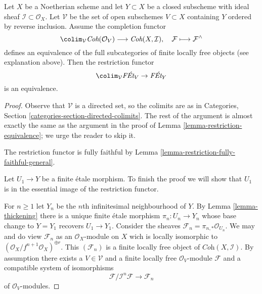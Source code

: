 \begin{lemma}
\label{lemma-restriction-equivalence-general}
Let $X$ be a Noetherian scheme and let $Y \subset X$ be a closed subscheme
with ideal sheaf $\mathcal{I} \subset \mathcal{O}_X$.
Let $\mathcal{V}$ be the set of open subschemes $V \subset X$ containing $Y$
ordered by reverse inclusion. Assume the completion functor
$$
\colim_\mathcal{V} \textit{Coh}(\mathcal{O}_V)
\longrightarrow
\textit{Coh}(X, \mathcal{I}),
\quad
\mathcal{F} \longmapsto \mathcal{F}^\wedge
$$
defines an equivalence of the full subcategories of
finite locally free objects (see explanation above).
Then the restriction functor
$$
\colim_\mathcal{V} \textit{F\'Et}_V \to \textit{F\'Et}_Y
$$
is an equivalence.
\end{lemma}

\begin{proof}
Observe that $\mathcal{V}$ is a directed set, so the colimits are
as in Categories, Section \ref{categories-section-directed-colimits}.
The rest of the argument is almost exactly the same as the argument
in the proof of Lemma \ref{lemma-restriction-equivalence}; we urge
the reader to skip it.

\medskip\noindent
The restriction functor is fully faithful by
Lemma \ref{lemma-restriction-fully-faithful-general}.

\medskip\noindent
Let $U_1 \to Y$ be a finite \'etale morphism. To finish the proof
we will show that $U_1$ is in the essential image of the
restriction functor.

\medskip\noindent
For $n \geq 1$ let $Y_n$ be the $n$th infinitesimal neighbourhood of $Y$.
By Lemma \ref{lemma-thickening}
there is a unique finite \'etale morphism
$\pi_n : U_n \to Y_n$ whose base change to $Y = Y_1$
recovers $U_1 \to Y_1$.
Consider the sheaves $\mathcal{F}_n = \pi_{n, *}\mathcal{O}_{U_n}$.
We may and do view $\mathcal{F}_n$ as an $\mathcal{O}_X$-module on $X$
wich is locally isomorphic to
$(\mathcal{O}_X/f^{n + 1}\mathcal{O}_X)^{\oplus r}$.
This $(\mathcal{F}_n)$ is a finite locally free object of
$\textit{Coh}(X, \mathcal{I})$.
By assumption there exists a $V \in \mathcal{V}$
and a finite locally free $\mathcal{O}_V$-module $\mathcal{F}$
and a compatible system of isomorphisms
$$
\mathcal{F}/\mathcal{I}^n\mathcal{F} \to \mathcal{F}_n
$$
of $\mathcal{O}_V$-modules.


\end{proof}
